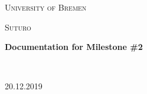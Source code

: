 \documentclass[12pt,a4paper]{report}%
\begin{document}

\begin{titlepage}

{

	\centering

	{\scshape\LARGE University of Bremen \par}

	\vspace{1cm}

	{\scshape\Large Suturo \par}

	\vspace{1.5cm}

	{\huge\bfseries Documentation for Milestone \#2 \par}

	\vspace{2cm}

	\hfill

	\\

	{20.12.2019 \par}

}

\end{titlepage}





\tableofcontents
























\end{document}
